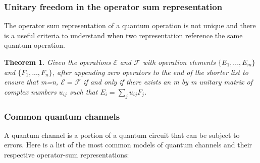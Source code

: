 \documentclass{article}
\newtheorem{theorem}{Theorem}
\begin{document}
\subsubsection{Unitary freedom in the operator sum representation}

The operator sum representation of a quantum operation is not unique and there
is a useful criteria to understand when two representation reference the same
quantum operation.
\begin{theorem}
	\label{freedom}
	Given the operations $\mathcal{E}$ and $\mathcal{F}$ with operation elements
	$\{E_1,...,E_m\}$ and $\{F_1,...,F_n\}$, after appending zero operators
	to the end of the shorter list to ensure that m=n,
	$\mathcal{E}=\mathcal{F}$ if and only if there exists an m by m unitary matrix
	of complex numbers $u_{ij}$ such that $E_i = \sum_j u_{ij} F_j$.

\end{theorem}



\subsubsection{Common quantum channels}
A quantum channel is a portion of a quantum circuit that can be subject to errors.
Here is a list of the most common models of quantum channels and their respective
operator-sum representations:
\end{document}
